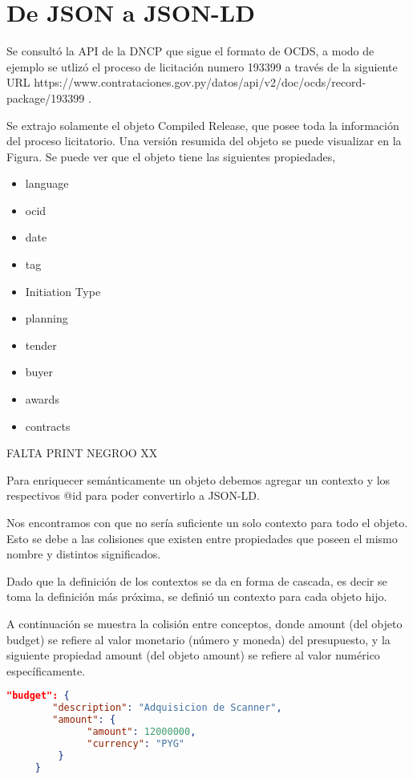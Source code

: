 \section{De JSON a JSON-LD}


Se consultó la API de la DNCP que sigue el formato de OCDS, a modo de ejemplo se utlizó el proceso de licitación numero 193399 a través de la siguiente URL https://www.contrataciones.gov.py/datos/api/v2/doc/ocds/record-package/193399 .

Se extrajo solamente el objeto Compiled Release, que posee toda la información del proceso licitatorio. Una versión resumida del objeto se puede visualizar en la Figura. Se puede ver que el objeto tiene las siguientes propiedades,

\begin{itemize}
    \item language
    \item ocid
    \item date
    \item tag
    \item Initiation Type
    \item planning
    \item tender
    \item buyer
    \item awards
    \item contracts
    
\end{itemize}

FALTA PRINT NEGROO XX



Para enriquecer semánticamente un objeto debemos agregar un contexto y los respectivos @id para poder convertirlo a JSON-LD. 

Nos encontramos con que no sería suficiente un solo contexto para todo el objeto. Esto se debe a las colisiones que existen entre propiedades que poseen el mismo nombre y distintos significados.

Dado que la definición de los contextos se da en forma de cascada, es decir se toma la definición más próxima, se definió un contexto para cada objeto hijo.

A continuación se muestra la colisión entre conceptos, donde amount (del objeto budget) se refiere al valor monetario (número y moneda) del presupuesto, y la siguiente propiedad amount (del objeto amount) se refiere al valor numérico específicamente.


\begin{lstlisting}[captionpos=b, caption=Objeto JSON , label=lst:oJson,language=json,firstnumber=1]
    "budget": {
        "description": "Adquisicion de Scanner",
        "amount": {
              "amount": 12000000,
              "currency": "PYG"
         }
     }  
    \end{lstlisting}



